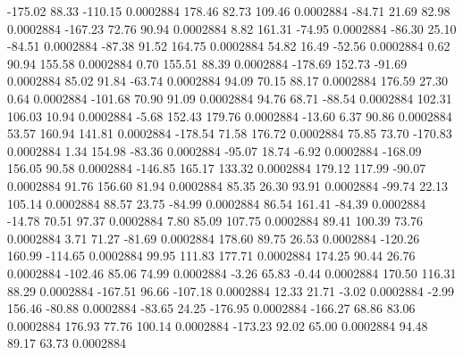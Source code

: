      -175.02       88.33     -110.15     0.0002884
      178.46       82.73      109.46     0.0002884
      -84.71       21.69       82.98     0.0002884
     -167.23       72.76       90.94     0.0002884
        8.82      161.31      -74.95     0.0002884
      -86.30       25.10      -84.51     0.0002884
      -87.38       91.52      164.75     0.0002884
       54.82       16.49      -52.56     0.0002884
        0.62       90.94      155.58     0.0002884
        0.70      155.51       88.39     0.0002884
     -178.69      152.73      -91.69     0.0002884
       85.02       91.84      -63.74     0.0002884
       94.09       70.15       88.17     0.0002884
      176.59       27.30        0.64     0.0002884
     -101.68       70.90       91.09     0.0002884
       94.76       68.71      -88.54     0.0002884
      102.31      106.03       10.94     0.0002884
       -5.68      152.43      179.76     0.0002884
      -13.60        6.37       90.86     0.0002884
       53.57      160.94      141.81     0.0002884
     -178.54       71.58      176.72     0.0002884
       75.85       73.70     -170.83     0.0002884
        1.34      154.98      -83.36     0.0002884
      -95.07       18.74       -6.92     0.0002884
     -168.09      156.05       90.58     0.0002884
     -146.85      165.17      133.32     0.0002884
      179.12      117.99      -90.07     0.0002884
       91.76      156.60       81.94     0.0002884
       85.35       26.30       93.91     0.0002884
      -99.74       22.13      105.14     0.0002884
       88.57       23.75      -84.99     0.0002884
       86.54      161.41      -84.39     0.0002884
      -14.78       70.51       97.37     0.0002884
        7.80       85.09      107.75     0.0002884
       89.41      100.39       73.76     0.0002884
        3.71       71.27      -81.69     0.0002884
      178.60       89.75       26.53     0.0002884
     -120.26      160.99     -114.65     0.0002884
       99.95      111.83      177.71     0.0002884
      174.25       90.44       26.76     0.0002884
     -102.46       85.06       74.99     0.0002884
       -3.26       65.83       -0.44     0.0002884
      170.50      116.31       88.29     0.0002884
     -167.51       96.66     -107.18     0.0002884
       12.33       21.71       -3.02     0.0002884
       -2.99      156.46      -80.88     0.0002884
      -83.65       24.25     -176.95     0.0002884
     -166.27       68.86       83.06     0.0002884
      176.93       77.76      100.14     0.0002884
     -173.23       92.02       65.00     0.0002884
       94.48       89.17       63.73     0.0002884

